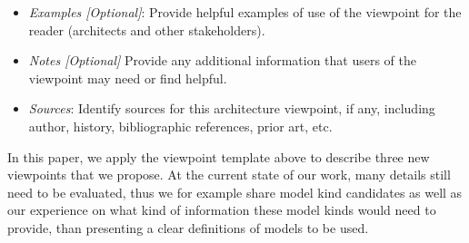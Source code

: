 \begin{itemize}
\item {\em Examples [Optional]}: 
Provide helpful examples of use of the viewpoint for the reader
(architects and other stakeholders).
\item {\em Notes [Optional]} Provide any additional information that users of the viewpoint may
need or find helpful.
\item {\em Sources}: Identify sources for this architecture viewpoint, if any,
  including author, history, bibliographic references, prior art, etc.
\end{itemize}

In this paper, we apply the viewpoint template above to describe three new viewpoints that we propose.
At the current state of our work, many details still need to be evaluated, thus we for example share model kind candidates as well as our experience on what kind of information these model kinds would need to provide, than presenting a clear definitions of models to be used.

